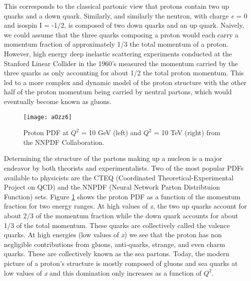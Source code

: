 \noindent
This corresponds to the classical partonic view that protons contain two up quarks and a down quark.  Similarly, and similarly the neutron, with charge \textit{e} = 0 and isospin I = -1/2, is composed of two down quarks and an up quark.  Naively, we could assume that the three quarks composing a proton would each carry a momentum fraction of approximately 1/3 the total momentum of a proton.  However, high energy deep inelastic scattering experiments conducted at the Stanford Linear Collider in the 1960's\cite{Panofsky:871460} measured the momentum carried by the three quarks as only accounting for about 1/2 the total proton momentum.  This led to a more complex and dynamic model of the proton structure with the other half of the proton momentum being carried by neutral partons, which would eventually become known as gluons.

\begin{figure}[h]
\texttt{[image: aOzz6]}
\centering
\caption{Proton PDF at $Q^{2}$ = 10 GeV (left) and  $Q^{2}$ = 10 TeV (right) from the NNPDF Collaboration\cite{Feltesse:2010}.}
\label{fig:PDFNNPDF}
\end{figure}

Determining the structure of the partons making up a nucleon is a major endeavor by both theorists and experimentalists.  Two of the most popular PDFs available to physicists are the CTEQ\cite{Kovarik:2013sya} (Coordinated Theoretical-Experimental Project on QCD) and the NNPDF\cite{Ball:1966481} (Neural Network Parton Distribtuion Function) sets.  Figure \ref{fig:PDFNNPDF} shows the proton PDF as a function of the momentum fraction for two energy ranges.  At high values of \textit{x}, the two up quarks account for about 2/3 of the momentum fraction while the down quark accounts for about 1/3 of the total momentum.  These quarks are collectively called the valence quarks.  At high energies (low values of \textit{x}) we see that the proton has non negligible contributions from gluons, anti-quarks, strange, and even charm quarks.  These are collectively known as the sea partons.  Today, the modern picture of a proton's structure is mostly composed of gluons and sea quarks at low values of \textit{x} and this domination only increases as a function of $Q^{2}$\cite{Fritzsch:1992mu}.

